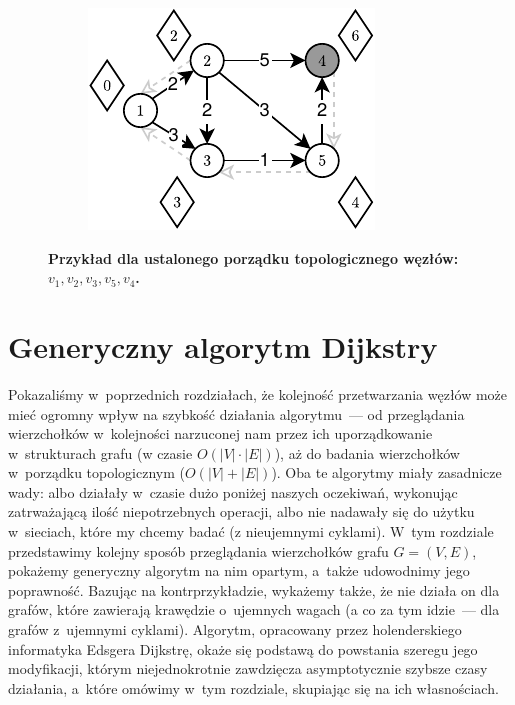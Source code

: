\begin{figure}[!htbp]
\begin{subfigure}[b]{0.18\textwidth}
		\includegraphics[width=\textwidth]{Chapter_II/TOPOLOGIC-SHORTEST-PATH-Example/e.pdf}
		\caption{}
	\end{subfigure}
	\caption{\textbf{Przykład dla ustalonego porządku topologicznego węzłów: $v_{1}, v_{2}, v_{3}, v_{5}, v_{4}$.}} \label{fig:exampleTopologicalShotrestPath}
\end{figure}

\newpage
\section{Generyczny algorytm Dijkstry}
\label{sec:dijkstraGenericAlgorithm}

Pokazaliśmy w~poprzednich rozdziałach, że kolejność przetwarzania węzłów może mieć ogromny wpływ na szybkość działania algorytmu~--- od przeglądania wierzchołków w~kolejności narzuconej nam przez ich uporządkowanie w~strukturach grafu (w czasie $ O \left( \left| V \right| \cdot \left| E \right| \right)$), aż do badania wierzchołków w~porządku topologicznym ($ O \left( \left| V \right| + \left| E \right| \right)$). Oba te algorytmy miały zasadnicze wady: albo działały w~czasie dużo poniżej naszych oczekiwań, wykonując zatrważającą ilość niepotrzebnych operacji, albo nie nadawały się do użytku w~sieciach, które my chcemy badać (z nieujemnymi cyklami). W~tym rozdziale przedstawimy kolejny sposób przeglądania wierzchołków grafu $G = \left( V, E \right)$, pokażemy generyczny algorytm na nim opartym, a~także udowodnimy jego poprawność. Bazując na kontrprzykładzie, wykażemy także, że nie działa on dla grafów, które zawierają krawędzie o~ujemnych wagach (a co za tym idzie~--- dla grafów z~ujemnymi cyklami). Algorytm, opracowany przez holenderskiego informatyka Edsgera Dijkstrę, okaże się podstawą do powstania szeregu jego modyfikacji, którym niejednokrotnie zawdzięcza asymptotycznie szybsze czasy działania, a~które omówimy w~tym rozdziale, skupiając się na ich własnościach.

